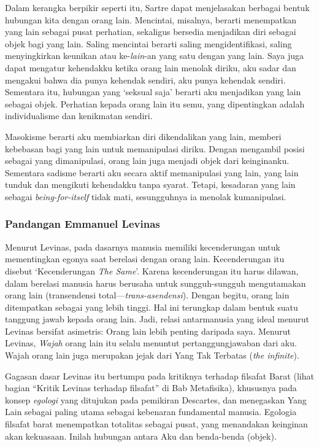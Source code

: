 \documentclass[10pt,a4paper]{article}
\begin{document}
\begin{multicols}{2}
Dalam kerangka berpikir seperti itu, Sartre dapat menjelasakan berbagai
bentuk hubungan kita dengan orang lain. Mencintai, misalnya, berarti
menempatkan yang lain sebagai pusat perhatian, sekaligus bersedia
menjadikan diri sebagai objek bagi yang lain. Saling mencintai berarti
saling mengidentifikasi, saling menyingkirkan keunikan atau
ke-\emph{lain}-an yang satu dengan yang lain. Saya juga dapat mengatur
kehendakku ketika orang lain menolak diriku, aku sadar dan mengakui
bahwa dia punya kehendak sendiri, aku punya kehendak sendiri. Sementara
itu, hubungan yang `seksual saja' berarti aku menjadikan yang lain
sebagai objek. Perhatian kepada orang lain itu semu, yang dipentingkan
adalah individualisme dan kenikmatan sendiri.

Masokisme berarti aku membiarkan diri dikendalikan yang lain, memberi
kebebasan bagi yang lain untuk memanipulasi diriku. Dengan mengambil
posisi sebagai yang dimanipulasi, orang lain juga menjadi objek dari
keinginanku. Sementara sadisme berarti aku secara aktif memanipulasi
yang lain, yang lain tunduk dan mengikuti kehendakku tanpa syarat.
Tetapi, kesadaran yang lain sebagai \emph{being-for-itself} tidak mati,
sesungguhnya ia menolak kumanipulasi.

\hypertarget{pandangan-emmanuel-levinas}{%
\subsubsection{Pandangan Emmanuel
Levinas}\label{pandangan-emmanuel-levinas}}

Menurut Levinas, pada dasarnya manusia memiliki kecenderungan untuk
mementingkan egonya saat berelasi dengan orang lain. Kecenderungan itu
disebut `Kecenderungan \emph{The Same}'. Karena kecenderungan itu harus
dilawan, dalam berelasi manusia harus berusaha untuk sungguh-sungguh
mengutamakan orang lain (transendensi total---\emph{trans-asendensi}).
Dengan begitu, orang lain ditempatkan sebagai yang lebih tinggi. Hal ini
terungkap dalam bentuk suatu tanggung jawab kepada orang lain. Jadi,
relasi antarmanusia yang ideal menurut Levinas bersifat asimetris: Orang
lain lebih penting daripada saya. Menurut Levinas, \emph{Wajah} orang
lain itu selalu menuntut pertanggungjawaban dari aku. Wajah orang lain
juga merupakan jejak dari Yang Tak Terbatas (\emph{the infinite}).

Gagasan dasar Levinas itu bertumpu pada kritiknya terhadap filsafat
Barat (lihat bagian ``Kritik Levinas terhadap filsafat'' di Bab
Metafisika), khususnya pada konsep \emph{egologi} yang ditujukan pada
pemikiran Descartes, dan menegaskan Yang Lain sebagai paling utama
sebagai kebenaran fundamental manusia. Egologia filsafat barat
menempatkan totalitas sebagai pusat, yang menandakan keinginan akan
kekuasaan. Inilah hubungan antara Aku dan benda-benda (objek).


\end{multicols}
\end{document}
